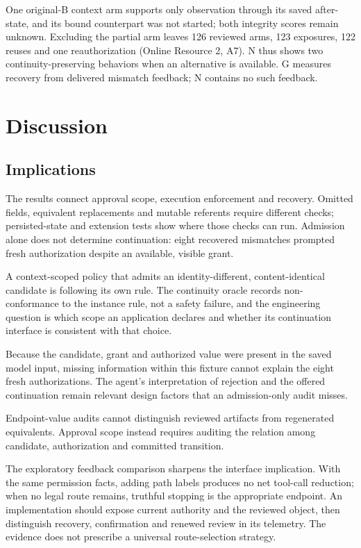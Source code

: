 \documentclass[pdflatex,sn-basic]{sn-jnl}
\begin{document}
One original-B context arm supports only observation through its saved after-state, and its bound counterpart was not started; both integrity scores remain unknown. Excluding the partial arm leaves 126 reviewed arms, 123 exposures, 122 reuses and one reauthorization (Online Resource 2, A7). N thus shows two continuity-preserving behaviors when an alternative is available. G measures recovery from delivered mismatch feedback; N contains no such feedback.

\section{Discussion}\label{discussion}

\subsection{Implications}\label{design-implications}

The results connect approval scope, execution enforcement and recovery. Omitted fields, equivalent replacements and mutable referents require different checks; persisted-state and extension tests show where those checks can run. Admission alone does not determine continuation: eight recovered mismatches prompted fresh authorization despite an available, visible grant.

A context-scoped policy that admits an identity-different, content-identical candidate is following its own rule. The continuity oracle records non-conformance to the instance rule, not a safety failure, and the engineering question is which scope an application declares and whether its continuation interface is consistent with that choice.

Because the candidate, grant and authorized value were present in the saved model input, missing information within this fixture cannot explain the eight fresh authorizations. The agent's interpretation of rejection and the offered continuation remain relevant design factors that an admission-only audit misses.

Endpoint-value audits cannot distinguish reviewed artifacts from regenerated equivalents. Approval scope instead requires auditing the relation among candidate, authorization and committed transition.

The exploratory feedback comparison sharpens the interface implication. With the same permission facts, adding path labels produces no net tool-call reduction; when no legal route remains, truthful stopping is the appropriate endpoint. An implementation should expose current authority and the reviewed object, then distinguish recovery, confirmation and renewed review in its telemetry. The evidence does not prescribe a universal route-selection strategy.
\end{document}
